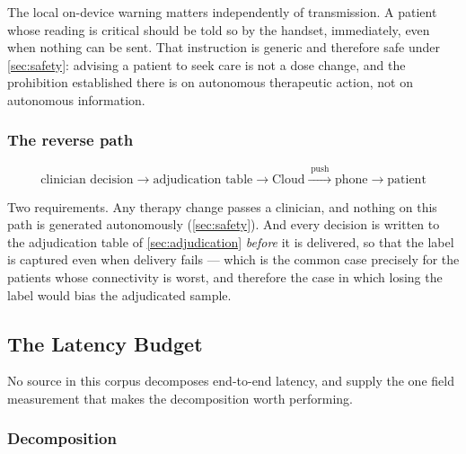 \documentclass[12pt,a4paper,oneside]{report}
\begin{document}
The local on-device warning matters independently of transmission. A patient whose reading is critical should be told so by the handset, immediately, even when nothing can be sent. That instruction is generic and therefore safe under \cref{sec:safety}: advising a patient to seek care is not a dose change, and the prohibition established there is on autonomous therapeutic action, not on autonomous information.

\subsubsection{The reverse path}

\begin{equation}
\text{clinician decision} \to \text{adjudication table} \to \text{Cloud}
\xrightarrow{\;\text{push}\;} \text{phone} \to \text{patient}
\end{equation}

Two requirements. Any therapy change passes a clinician, and nothing on this path is generated autonomously (\cref{sec:safety}). And every decision is written to the adjudication table of \cref{sec:adjudication} \emph{before} it is delivered, so that the label is captured even when delivery fails --- which is the common case precisely for the patients whose connectivity is worst, and therefore the case in which losing the label would bias the adjudicated sample.

\subsection{The Latency Budget}\label{sec:latency}

No source in this corpus decomposes end-to-end latency, and \textcite{bediang2021} supply the one field measurement that makes the decomposition worth performing.

\subsubsection{Decomposition}
\end{document}
